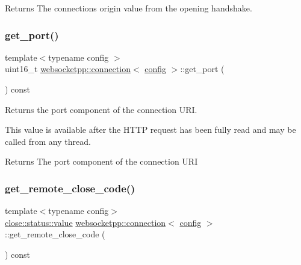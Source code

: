\begin{DoxyReturn}{Returns}
The connection\textquotesingle{}s origin value from the opening handshake. 
\end{DoxyReturn}
\mbox{\label{classwebsocketpp_1_1connection_af6651a691ee345daf5cfd31b875965ab}} 
\subsubsection{\texorpdfstring{get\+\_\+port()}{get\_port()}}
{\footnotesize\ttfamily template$<$typename config $>$ \\
uint16\+\_\+t \mbox{\hyperlink{classwebsocketpp_1_1connection}{websocketpp\+::connection}}$<$ \mbox{\hyperlink{classconfig}{config}} $>$\+::get\+\_\+port (\begin{DoxyParamCaption}{ }\end{DoxyParamCaption}) const}



Returns the port component of the connection U\+RI. 

This value is available after the H\+T\+TP request has been fully read and may be called from any thread.

\begin{DoxyReturn}{Returns}
The port component of the connection U\+RI 
\end{DoxyReturn}
\mbox{\label{classwebsocketpp_1_1connection_aad217d74120fb96a39d71c330e0ffa41}} 
\subsubsection{\texorpdfstring{get\+\_\+remote\+\_\+close\+\_\+code()}{get\_remote\_close\_code()}}
{\footnotesize\ttfamily template$<$typename config$>$ \\
\mbox{\hyperlink{namespacewebsocketpp_1_1close_1_1status_a8614a5c4733d708e2d2a32191c5bef84}{close\+::status\+::value}} \mbox{\hyperlink{classwebsocketpp_1_1connection}{websocketpp\+::connection}}$<$ \mbox{\hyperlink{classconfig}{config}} $>$\+::get\+\_\+remote\+\_\+close\+\_\+code (\begin{DoxyParamCaption}{ }\end{DoxyParamCaption}) const\hspace{0.3cm}{\ttfamily [inline]}}



